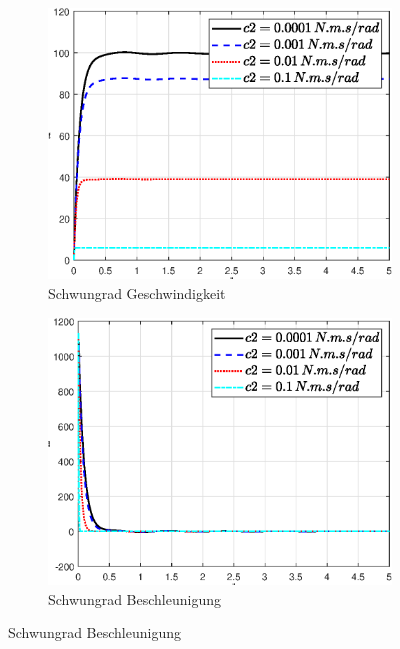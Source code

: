\begin{figure}
    \captionsetup[subfigure]{justification=centering,font=footnotesize}
    \begin{subfigure}[b]{0.49\linewidth}
        \includegraphics[width=\linewidth]{Bilder/5_sensi/fig/c2/phi_punkt.eps}
        \caption{Schwungrad Geschwindigkeit}
        \label{fig:c2_phi_punkt}
    \end{subfigure}
    \begin{subfigure}[b]{0.49 \linewidth}
        \includegraphics[width=\linewidth]{Bilder/5_sensi/fig/c2/phi_punkt_punkt.eps}
        \caption{Schwungrad Beschleunigung}
        \label{fig:c2_phi_punkt_punkt}

\end{subfigure}
\end{figure}
